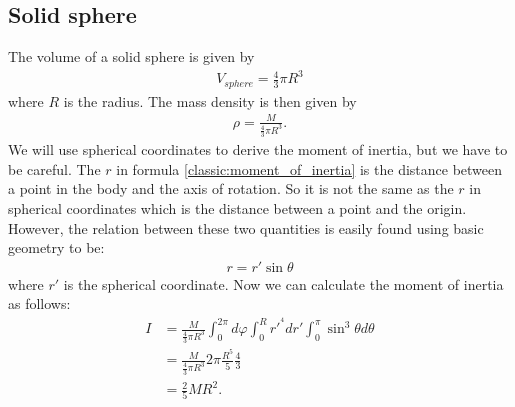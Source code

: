 \subsection{Solid sphere}

    The volume of a solid sphere is given by
    \begin{gather}
        V_{sphere} = \frac{4}{3}\pi R^3
    \end{gather}
    where $R$ is the radius. The mass density is then given by
    \begin{gather}
        \rho = \frac{M}{\frac{4}{3}\pi R^3}.
    \end{gather}
    We will use spherical coordinates to derive the moment of inertia, but we have to be careful. The $r$ in formula \ref{classic:moment_of_inertia} is the distance between a point in the body and the axis of rotation. So it is not the same as the $r$ in spherical coordinates which is the distance between a point and the origin. However, the relation between these two quantities is easily found using basic geometry to be:
    \begin{gather}
        r = r'\sin\theta
    \end{gather}
    where $r'$ is the spherical coordinate. Now we can calculate the moment of inertia as follows:
    \begin{align}
        I &= \frac{M}{\frac{4}{3}\pi R^3} \int_0^{2\pi}d\varphi\int_0^Rr'^{^4}dr'\int_0^\pi\sin^3\theta d\theta\\
        &= \frac{M}{\frac{4}{3}\pi R^3} 2\pi \frac{R^5}{5} \frac{4}{3}\\
        &= \frac{2}{5}MR^2.
    \end{align}
